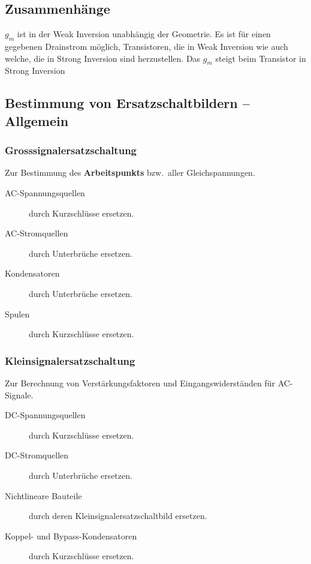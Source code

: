 
\subsection{Zusammenhänge}

$g_m$ ist in der Weak Inversion unabhängig der Geometrie. 
Es ist für einen gegebenen Drainstrom möglich, Transistoren, die in Weak Inversion wie auch welche, die in Strong Inversion sind herzustellen.
Das $g_m$ steigt beim Transistor in Strong Inversion 

\subsection{Bestimmung von Ersatzschaltbildern -- Allgemein}
\subsubsection{Grosssignalersatzschaltung}
\label{Grosssignalersatzschaltung}

Zur Bestimmung des \textbf{Arbeitspunkts} bzw.\ aller Gleichspannungen.
\begin{description}
    \item[AC-Spannungsquellen] durch Kurzschlüsse ersetzen.
    \item[AC-Stromquellen] durch Unterbrüche ersetzen. 
    \item[Kondensatoren] durch Unterbrüche ersetzen.
    \item[Spulen] durch Kurzschlüsse ersetzen.  
\end{description}

\subsubsection{Kleinsignalersatzschaltung}
\label{Kleinsignalersatzschaltung}
Zur Berechnung von Verstärkungsfaktoren und Eingangswiderständen für AC-Signale.

\begin{description}
    \item[DC-Spannungsquellen] durch Kurzschlüsse ersetzen.
    \item[DC-Stromquellen] durch Unterbrüche ersetzen. 
    \item[Nichtlineare Bauteile] durch deren Kleinsignalersatzschaltbild ersetzen.
    \item[Koppel- und Bypass-Kondensatoren] durch Kurzschlüsse ersetzen.  
\end{description}


